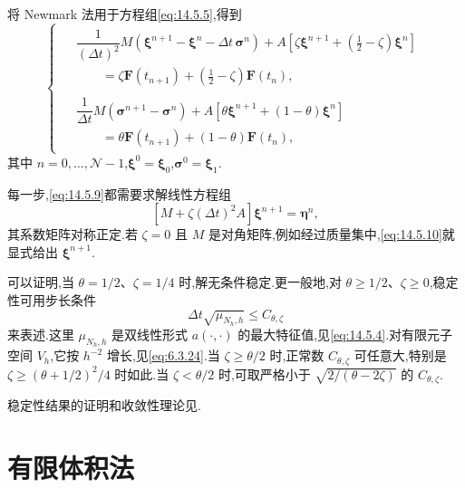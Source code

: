 将 Newmark 法用于方程组\eqref{eq:14.5.5},得到
\begin{equation}\label{eq:14.5.9}
  \begin{cases}
    \begin{aligned}
      &\dfrac1{(\Delta t)^2}M(\boldsymbol{\xi}^{n+1}-\boldsymbol{\xi}^n-\Delta t\,\boldsymbol{\sigma}^n)
        +A[\zeta\boldsymbol{\xi}^{n+1}+(\tfrac12-\zeta)\boldsymbol{\xi}^n]\\
      &\qquad=\zeta\boldsymbol{F}(t_{n+1})+(\tfrac12-\zeta)\boldsymbol{F}(t_n),
    \end{aligned}\\[4pt]
    \begin{aligned}
      &\dfrac1{\Delta t}M(\boldsymbol{\sigma}^{n+1}-\boldsymbol{\sigma}^n)
        +A[\theta\boldsymbol{\xi}^{n+1}+(1-\theta)\boldsymbol{\xi}^n]\\
      &\qquad=\theta\boldsymbol{F}(t_{n+1})+(1-\theta)\boldsymbol{F}(t_n),
    \end{aligned}
  \end{cases}
\end{equation}
其中 \(n=0,\ldots,\mathcal N-1\),\(\boldsymbol{\xi}^0=\boldsymbol{\xi}_0\),\(\boldsymbol{\sigma}^0=\boldsymbol{\xi}_1\).

每一步,\eqref{eq:14.5.9}都需要求解线性方程组
\begin{equation}\label{eq:14.5.10}
  [M+\zeta(\Delta t)^2A]\boldsymbol{\xi}^{n+1}=\boldsymbol{\eta}^n,
\end{equation}
其系数矩阵对称正定.若 \(\zeta=0\) 且 \(M\) 是对角矩阵,例如经过质量集中,\eqref{eq:14.5.10}就显式给出 \(\boldsymbol{\xi}^{n+1}\).

可以证明,当 \(\theta=1/2\)、\(\zeta=1/4\) 时,解无条件稳定.更一般地,对 \(\theta\ge1/2\)、\(\zeta\ge0\),稳定性可用步长条件
\[
  \Delta t\sqrt{\mu_{N_h,h}}\le C_{\theta,\zeta}
\]
来表述.这里 \(\mu_{N_h,h}\) 是双线性形式 \(a(\cdot,\cdot)\) 的最大特征值,见\eqref{eq:14.5.4}.对有限元子空间 \(V_h\),它按 \(h^{-2}\) 增长,见\eqref{eq:6.3.24}.当 \(\zeta\ge\theta/2\) 时,正常数 \(C_{\theta,\zeta}\) 可任意大,特别是 \(\zeta\ge(\theta+1/2)^2/4\) 时如此.当 \(\zeta<\theta/2\) 时,可取严格小于 \(\sqrt{2/(\theta-2\zeta)}\) 的 \(C_{\theta,\zeta}\).

稳定性结果的证明和收敛性理论见.

\section{有限体积法}\label{sec:14.6}


